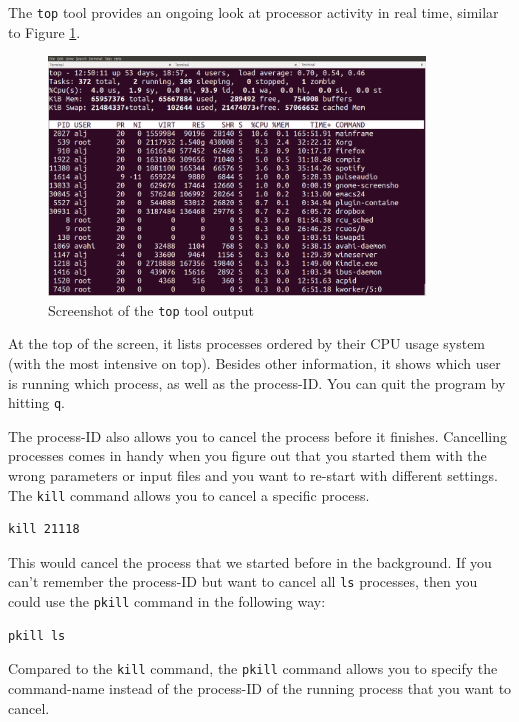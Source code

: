 \documentclass[11pt]{article}
\begin{document}
The \texttt{top} tool provides an ongoing look at processor activity in real
time, similar to Figure \ref{fig:top}.


\begin{figure}[htb]
\centering
\includegraphics[width=10cm]{top.png}
\caption{\label{fig:top}Screenshot of the \texttt{top} tool output}
\end{figure}

At the top of the screen, it lists processes ordered by their CPU usage
system (with the most intensive on top). Besides other information, it shows which user is running
which process, as well as the process-ID. You can quit the program by
hitting \texttt{q}.

The process-ID also allows you to cancel the process before it
finishes. Cancelling processes comes in handy when you figure out
that you started them with the wrong parameters or input files and you want
to re-start with different settings. The \texttt{kill} command allows you
to cancel a specific process.

\begin{verbatim}
kill 21118
\end{verbatim}

This would cancel the process that we started before in the
background. If you can't remember the process-ID but want to cancel
all \texttt{ls} processes, then you could use the \texttt{pkill} command in the
following way:

\begin{verbatim}
pkill ls
\end{verbatim}

Compared to the \texttt{kill} command, the \texttt{pkill} command allows you to
specify the command-name instead of the process-ID of the running
process that you want to cancel.
\end{document}
